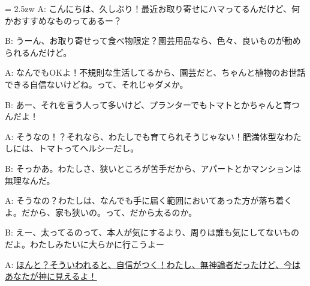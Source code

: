 \documentclass[11pt]{amsart}
\title{}
\author{}
\newenvironment{hangall}[1]{\hangindent = 2.5zw\everypar{\hangindent = 2.5zw}}{}
\begin{document}
\maketitle
\begin{hangall}{}%
A: こんにちは、久しぶり！最近お取り寄せにハマってるんだけど、何かおすすめなものってあるー？

B: うーん、お取り寄せって食べ物限定？園芸用品なら、色々、良いものが勧められるんだけど。

A: なんでもOKよ！不規則な生活してるから、園芸だと、ちゃんと植物のお世話できる自信ないけどね。って、それじゃダメか。

B: あー、それを言う人って多いけど、プランターでもトマトとかちゃんと育つんだよ！

A: そうなの！？それなら、わたしでも育てられそうじゃない！肥満体型なわたしには、トマトってヘルシーだし。

B: そっかあ。わたしさ、狭いところが苦手だから、アパートとかマンションは無理なんだ。

A: そうなの？わたしは、なんでも手に届く範囲においてあった方が落ち着くよ。だから、家も狭いの。って、だから太るのか。

B: えー、太ってるのって、本人が気にするより、周りは誰も気にしてないものだよ。わたしみたいに大らかに行こうよー

A: \ul{ほんと？そういわれると、自信がつく！わたし、無神論者だったけど、今はあなたが神に見えるよ！}\end{hangall}
\end{document}
